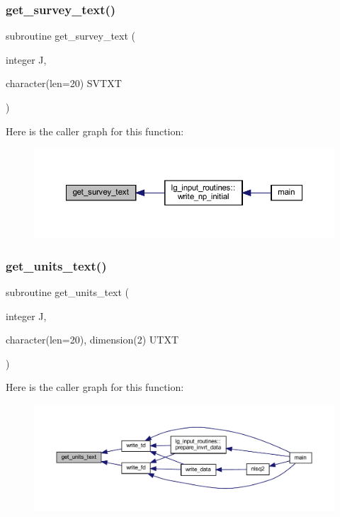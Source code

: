 \subsubsection{\texorpdfstring{get\+\_\+survey\+\_\+text()}{get\_survey\_text()}}
{\footnotesize\ttfamily subroutine get\+\_\+survey\+\_\+text (\begin{DoxyParamCaption}\item[{integer}]{J,  }\item[{character(len=20)}]{S\+V\+T\+XT }\end{DoxyParamCaption})}

Here is the caller graph for this function\+:\nopagebreak
\begin{figure}[H]
\begin{center}
\leavevmode
\includegraphics[width=350pt]{Leroi_8f90_a602ef79dc6e8eaec1a5e258d5a385ae9_icgraph}
\end{center}
\end{figure}
\mbox{\label{Leroi_8f90_a5297bfa86ffada4b884da99673085b6a}} 
\subsubsection{\texorpdfstring{get\+\_\+units\+\_\+text()}{get\_units\_text()}}
{\footnotesize\ttfamily subroutine get\+\_\+units\+\_\+text (\begin{DoxyParamCaption}\item[{integer}]{J,  }\item[{character(len=20), dimension(2)}]{U\+T\+XT }\end{DoxyParamCaption})}

Here is the caller graph for this function\+:\nopagebreak
\begin{figure}[H]
\begin{center}
\leavevmode
\includegraphics[width=350pt]{Leroi_8f90_a5297bfa86ffada4b884da99673085b6a_icgraph}
\end{center}
\end{figure}
\mbox{\label{Leroi_8f90_a94e83e050e27be19cb6d665d80c080bf}} 
